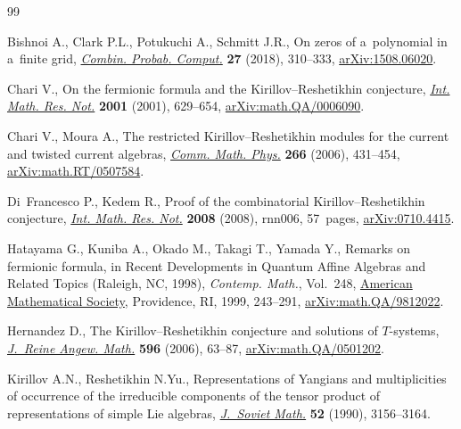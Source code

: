 \documentclass[pdftex]{sigma}
\numberwithin{equation}{section}
\theoremstyle{definition}
\begin{document}
\begin{thebibliography}{99}
\footnotesize\itemsep=0pt

Bishnoi A., Clark P.L., Potukuchi A., Schmitt J.R., On zeros of a~polynomial in
 a~finite grid,
 \href{https://doi.org/10.1017/S0963548317000566}{\textit{Combin. Probab.
 Comput.}} \textbf{27} (2018), 310--333,
 \href{http://arxiv.org/abs/1508.06020}{arXiv:1508.06020}.

Chari V., On the fermionic formula and the {K}irillov--{R}eshetikhin
 conjecture, \href{https://doi.org/10.1155/S1073792801000332}{\textit{Int.
 Math. Res. Not.}} \textbf{2001} (2001), 629--654,
 \href{http://arxiv.org/abs/math.QA/0006090}{arXiv:math.QA/0006090}.

Chari V., Moura A., The restricted {K}irillov--{R}eshetikhin modules for the
 current and twisted current algebras,
 \href{https://doi.org/10.1007/s00220-006-0032-2}{\textit{Comm. Math. Phys.}}
 \textbf{266} (2006), 431--454,
 \href{http://arxiv.org/abs/math.RT/0507584}{arXiv:math.RT/0507584}.

Di~Francesco P., Kedem R., Proof of the combinatorial {K}irillov--{R}eshetikhin
 conjecture, \href{https://doi.org/10.1093/imrn/rnn006}{\textit{Int. Math.
 Res. Not.}} \textbf{2008} (2008), rnn006, 57~pages,
 \href{http://arxiv.org/abs/0710.4415}{arXiv:0710.4415}.

Hatayama G., Kuniba A., Okado M., Takagi T., Yamada Y., Remarks on fermionic
 formula, in Recent {D}evelopments in {Q}uantum {A}ffine {A}lgebras and
 {R}elated {T}opics ({R}aleigh, {NC}, 1998), \textit{Contemp. Math.}, Vol.~248, \href{https://doi.org/10.1090/conm/248/03826}{American Mathematical
 Society}, Providence, RI, 1999, 243--291,
 \href{http://arxiv.org/abs/math.QA/9812022}{arXiv:math.QA/9812022}.

Hernandez D., The {K}irillov--{R}eshetikhin conjecture and solutions of
 {$T$}-systems,
 \href{https://doi.org/10.1515/CRELLE.2006.052}{\textit{J.~Reine Angew.
 Math.}} \textbf{596} (2006), 63--87,
 \href{http://arxiv.org/abs/math.QA/0501202}{arXiv:math.QA/0501202}.

Kirillov A.N., Reshetikhin N.Yu., Representations of {Y}angians and
 multiplicities of occurrence of the irreducible components of the tensor
 product of representations of simple {L}ie algebras,
 \href{https://doi.org/10.1007/BF02342935}{\textit{J.~Soviet Math.}}
 \textbf{52} (1990), 3156--3164.


\end{thebibliography}
\end{document}

